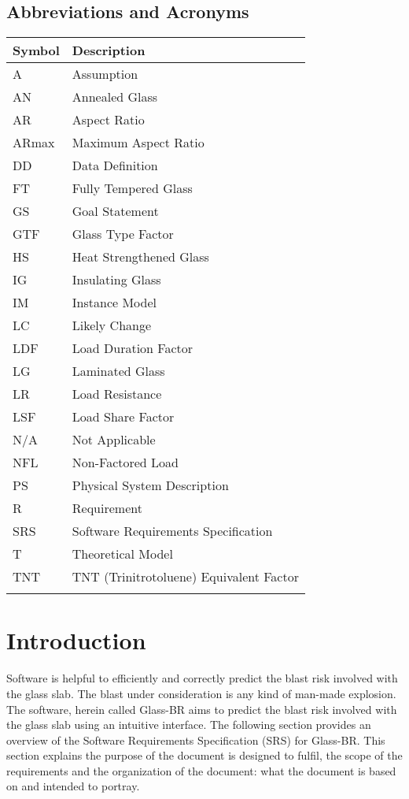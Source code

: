 \documentclass[12pt]{article}
\begin{document}
\subsection{Abbreviations and Acronyms}
\label{Sec:AaA}
\begin{longtable*}{l l}
\toprule
Symbol & Description
\\
\midrule
A & Assumption
\\
AN & Annealed Glass
\\
AR & Aspect Ratio
\\
ARmax & Maximum Aspect Ratio
\\
DD & Data Definition
\\
FT & Fully Tempered Glass
\\
GS & Goal Statement
\\
GTF & Glass Type Factor
\\
HS & Heat Strengthened Glass
\\
IG & Insulating Glass
\\
IM & Instance Model
\\
LC & Likely Change
\\
LDF & Load Duration Factor
\\
LG & Laminated Glass
\\
LR & Load Resistance
\\
LSF & Load Share Factor
\\
N/A & Not Applicable
\\
NFL & Non-Factored Load
\\
PS & Physical System Description
\\
R & Requirement
\\
SRS & Software Requirements Specification
\\
T & Theoretical Model
\\
TNT & TNT (Trinitrotoluene) Equivalent Factor
\\
\bottomrule
\label{Table:AaA}
\end{longtable*}
\section{Introduction}
\label{Sec:I}
Software is helpful to efficiently and correctly predict the blast risk involved with the glass slab. The blast under consideration is any kind of man-made explosion. The software, herein called Glass-BR aims to predict the blast risk involved with the glass slab using an intuitive interface. The following section provides an overview of the Software Requirements Specification (SRS) for Glass-BR. This section explains the purpose of the document is designed to fulfil, the scope of the requirements and the organization of the document: what the document is based on and intended to portray.
\end{document}
